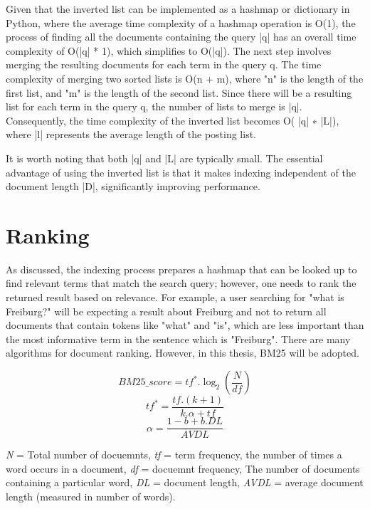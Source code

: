 Given that the inverted list can be implemented as a hashmap or dictionary in Python, where the average time complexity of a hashmap operation is O(1), the process of finding all the documents containing the query |q| has an overall time complexity of O(|q| * 1), which simplifies to O(|q|). The next step involves merging the resulting documents for each term in the query q. The time complexity of merging two sorted lists is O(n + m), where "n" is the length of the first list, and "m" is the length of the second list. Since there will be a resulting list for each term in the query q, the number of lists to merge is |q|. Consequently, the time complexity of the inverted list becomes O( |q| ∗ |L|), where |l| represents the average length of the posting list.

It is worth noting that both |q| and |L| are typically small. The essential advantage of using the inverted list is that it makes indexing independent of the document length |D|, significantly improving performance.

\section{Ranking}
\label{sec:ranking}
As discussed, the indexing process prepares a hashmap that can be looked up to find relevant terms that match the search query; however, one needs to rank the returned result based on relevance. For example, a user searching for "what is Freiburg?" will be expecting a result about Freiburg and not to return all documents that contain tokens like "what" and "is", which are less important than the most informative term in the sentence which is "Freiburg". There are many algorithms for document ranking. However, in this thesis, BM25 will be adopted. 

\begin{equation}
BM25\_score = tf^*.\log_2(\frac{N}{df})
\label{eq:bm25}
\end{equation}
\begin{equation}
tf^* = \frac{tf.(k+1)}{k.\alpha+tf}
\label{eq:tf}
\end{equation}
\begin{equation}
\alpha = \frac{1-b+b.DL}{AVDL}
\label{eq:alpha}
\end{equation}

\textit{N} = Total number of docuemnts, \textit{tf} = term frequency, the number of times a word occurs in a document, \textit{df} = docuemnt frequency, The number of documents containing a particular word, \textit{DL} = document length, \textit{AVDL} =
average document length (measured in number of words).

